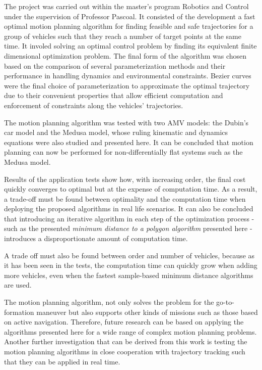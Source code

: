 \cleardoublepage%
\label{chap:conclusion}

\par The project was carried out within the master's program Robotics and Control under the supervision of Professor Pascoal. It consisted of the development a fast optimal motion planning algorithm for finding feasible and safe trajectories for a group of vehicles such that they reach a number of target points at the same time. It involed solving an optimal control problem by finding its equivalent finite dimensional optimization problem. The final form of the algorithm was chosen based on the comparison of several parameterization methods and their performance in handling dynamics and environmental constraints. Bezier curves were the final choice of parameterization to approximate the optimal trajectory due to their convenient properties that allow efficient computation and enforcement of constraints along the vehicles’ trajectories.



\par The motion planning algorithm was tested with two \ac{AMV} models: the Dubin's car model and the Medusa model, whose ruling kinematic and dynamics equations were also studied and presented here. It can be concluded that motion planning can now be performed for non-differentially flat systems such as the Medusa model.
\par Results of the application tests show how, with increasing order, the final cost quickly converges to optimal but at the expense of computation time. As a result, a trade-off must be found between optimality and the computation time when deploying the proposed algorithms in real life scenarios. It can also be concluded that introducing an iterative algorithm in each step of the optimization process - such as the presented \textit{minimum distance to a polygon algorithm} presented here - introduces a disproportionate amount of computation time.
\par A trade off must also be found between order and number of vehicles, because as it has been seen in the tests, the computation time can quickly grow when adding more vehicles, even when the fastest sample-based minimum distance algorithms are used.
\par The motion planning algorithm, not only solves the problem for the go-to-formation maneuver but also supports other kinds of missions such as those based on active navigation. Therefore, future research can be based on applying the algorithms presented here for a wide range of complex motion planning problems. Another further investigation that can be derived from this work is testing the motion planning algorithms in close cooperation with trajectory tracking such that they can be applied in real time.




